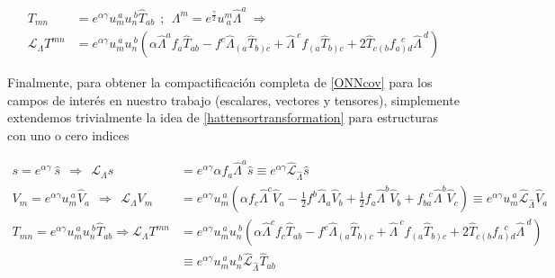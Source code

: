 \documentclass{article}
\numberwithin{equation}{section}
\begin{document}
\begin{equation}\label{hattensortransformation}
\begin{aligned}
T_{m n} &=  e^{\alpha \gamma} u_{m}^{ \ a} u_{n}^{ \ b} \hat{T}_{a b} \ \ ; \ \ \Lambda^m = e^{\frac{\gamma}{2}} u^{m}_{\ a} \hat{\Lambda}^a \ \Rightarrow\\
\mathcal{L}_{\Lambda} T^{m n} &=  e^{\alpha \gamma} u_{m}^{ \ a} u_{n}^{ \ b} \left( \alpha \hat{\Lambda}^a f_a \hat{T}_{a b} - f^c \hat{\Lambda}_{\left( a\right.} \hat{T}_{\left. b\right) c} + \hat{\Lambda}^{\ c} f_{\left( a \right.}\hat{T}_{\left. b\right) c}  + 2 \hat{T}_{c \left( b\right.}f_{\left. a\right) d}^{\ \ \  c} \hat{\Lambda}^{\ d}  \right)
\end{aligned}
\end{equation}


Finalmente, para obtener la compactificación completa de \ref{ONNcov} para los campos de interés en nuestro trabajo (escalares, vectores y tensores), simplemente extendemos trivialmente la idea de \ref{hattensortransformation} para estructuras con uno o cero indices 


\begin{boxeq}
	\begin{equation}\label{hatgaugetransformation}
	\begin{aligned}
	s = e^{\alpha \gamma} \ \hat{s} \ \ \Rightarrow \ \ \mathcal{L}_{\Lambda} s &= e^{\alpha \gamma} \alpha f_a \hat{\Lambda}^a \hat{s} \equiv e^{\alpha \gamma} \hat{\mathcal{L}}_{\hat{\Lambda}} \hat{s} \\
	V_{m} = e^{\alpha \gamma} u_{m}^{\ a} \hat{V}_{a} \ \ \Rightarrow \ \ \mathcal{L}_{\Lambda} V_{m} &= e^{\alpha \gamma} u_{m}^{\ a} \left(\alpha f_c \hat{\Lambda}^c \hat{V}_{a} - \frac{1}{2}f^b \hat{\Lambda}_a \hat{V}_b + \frac{1}{2} f_a \hat{\Lambda}^b \hat{V}_b + f_{b a}^{\ \ \ c} \hat{\Lambda}^b \hat{V}_{c}\right) \equiv e^{\alpha \gamma} u_{m}^{\ a} \hat{\mathcal{L}}_{\hat{\Lambda}} \hat{V}_a \\
	T_{m n} =  e^{\alpha \gamma} u_{m}^{ \ a} u_{n}^{ \ b} \hat{T}_{a b} \Rightarrow
	\mathcal{L}_{\Lambda} T^{m n} &= e^{\alpha \gamma} u_{m}^{ \ a} u_{n}^{ \ b} \left( \alpha \hat{\Lambda}^c f_c \hat{T}_{a b} - f^c \hat{\Lambda}_{\left( a\right.} \hat{T}_{\left. b\right) c} + \hat{\Lambda}^{\ c} f_{\left( a \right.}\hat{T}_{\left. b\right) c}  + 2 \hat{T}_{c \left( b\right.}f_{\left. a\right) d}^{\ \ \  c} \hat{\Lambda}^{\ d}  \right)\\
	&\equiv e^{\alpha \gamma} u_{m}^{ \ a} u_{n}^{ \ b}  \hat{\mathcal{L}}_{\hat{\Lambda}} \hat{T}_{a b}
	\end{aligned}
	\end{equation}
\end{boxeq}
\end{document}
